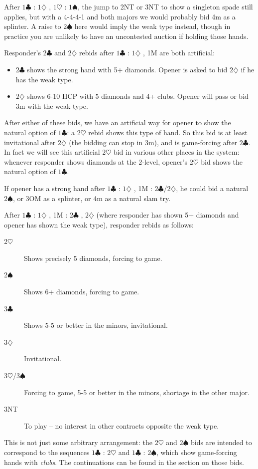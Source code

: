 \documentclass{article}
\newcommand{\sz}{\spadesuit}
\newcommand{\hz}{\heartsuit}
\newcommand{\dz}{\diamondsuit}
\newcommand{\cz}{\clubsuit}
\begin{document}
\begin{description}
After $1\cz$ : $1\dz$ , $1\hz$ : $1\sz$, the jump to 2NT or 3NT to show a singleton spade still applies, but with a 4-4-4-1 and both majors we would probably bid 4m as a splinter. A raise to $2\sz$ here would imply the weak type instead, though in practice you are unlikely to have an uncontested auction if holding those hands.
\end{description}

Responder's $2\cz$ and $2\dz$ rebids after $1\cz$ : $1\dz$ , 1M are both artificial:
\begin{itemize}
\item $2\cz$ shows the strong hand with 5+ diamonds. Opener is asked to bid $2\dz$ if he has the weak type.
\item $2\dz$ shows 6-10 HCP with 5 diamonds and 4+ clubs. Opener will pass or bid 3m with the weak type.
\end{itemize}
After either of these bids, we have an artificial way for opener to show the natural option of $1\cz$: a $2\hz$ rebid shows this type of hand. So this bid is at least invitational after $2\dz$ (the bidding can stop in 3m), and is game-forcing after $2\cz$. In fact we will see this artificial $2\hz$ bid in various other places in the system: whenever responder shows diamonds at the 2-level, opener's $2\hz$ bid shows the natural option of $1\cz$.

If opener has a strong hand after $1\cz$ : $1\dz$ , 1M : $2\cz$/$2\dz$, he could bid a natural $2\sz$, or 3OM as a splinter, or 4m as a natural slam try.

After $1\cz$ : $1\dz$ , 1M : $2\cz$ , $2\dz$ (where responder has shown 5+ diamonds and opener has shown the weak type), responder rebids as follows:
\begin{description}
\item[2$\hz$] Shows precisely 5 diamonds, forcing to game.
\item[2$\sz$] Shows 6+ diamonds, forcing to game.
\item[3$\cz$] Shows 5-5 or better in the minors, invitational.
\item[3$\dz$] Invitational.
\item[3$\hz$/3$\sz$] Forcing to game, 5-5 or better in the minors, shortage in the other major.
\item[3NT] To play -- no interest in other contracts opposite the weak type.
\end{description}
This is not just some arbitrary arrangement: the $2\hz$ and $2\sz$ bids are intended to correspond to the sequences $1\cz$ : $2\hz$ and $1\cz$ : $2\sz$, which show game-forcing hands with \emph{clubs}. The continuations can be found in the section on those bids.
\end{document}
